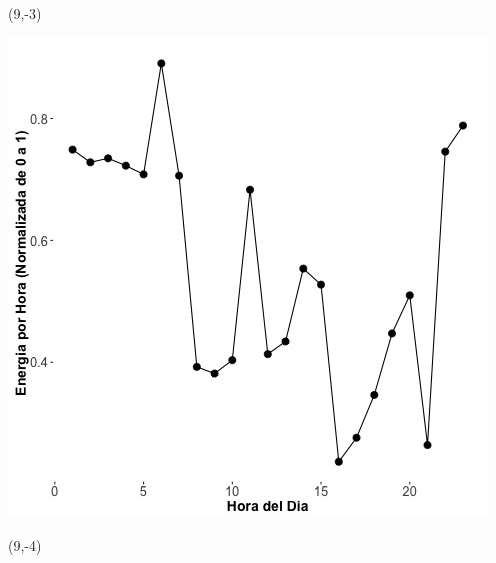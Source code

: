 \documentclass{article}\usepackage[]{graphicx}\usepackage[]{color}
\newenvironment{knitrout}{}{} %
\begin{document}
 \begin{textblock}{1}(9,-3)
\begin{minipage}{20em}
\begingroup

\endgroup
\end{minipage}
\end{textblock}

 \vspace{2cm}

\begin{knitrout}
\color{fgcolor}
\includegraphics[scale=0.75]{figure/A21_fplot_norm_median} 
\end{knitrout}


 \begin{textblock}{1}(9,-4)
\begin{minipage}{20em}
\begingroup

\endgroup
\end{minipage}
\end{textblock}

 \vspace{2cm}


%
\end{document}
